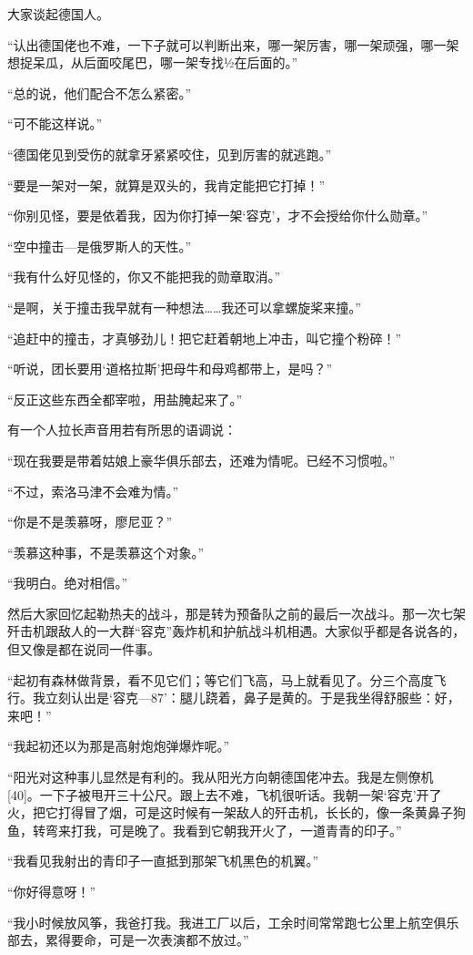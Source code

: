 大家谈起德国人。

“认出德国佬也不难，一下子就可以判断出来，哪一架厉害，哪一架顽强，哪一架想捉呆瓜，从后面咬尾巴，哪一架专找½在后面的。”

“总的说，他们配合不怎么紧密。”

“可不能这样说。”

“德国佬见到受伤的就拿牙紧紧咬住，见到厉害的就逃跑。”

“要是一架对一架，就算是双头的，我肯定能把它打掉！”

“你别见怪，要是依着我，因为你打掉一架‘容克’，才不会授给你什么勋章。”

“空中撞击—是俄罗斯人的天性。”

“我有什么好见怪的，你又不能把我的勋章取消。”

“是啊，关于撞击我早就有一种想法……我还可以拿螺旋桨来撞。”

“追赶中的撞击，才真够劲儿！把它赶着朝地上冲击，叫它撞个粉碎！”

“听说，团长要用‘道格拉斯’把母牛和母鸡都带上，是吗？”

“反正这些东西全都宰啦，用盐腌起来了。”

有一个人拉长声音用若有所思的语调说：

“现在我要是带着姑娘上豪华俱乐部去，还难为情呢。已经不习惯啦。”

“不过，索洛马津不会难为情。”

“你是不是羡慕呀，廖尼亚？”

“羡慕这种事，不是羡慕这个对象。”

“我明白。绝对相信。”

然后大家回忆起勒热夫的战斗，那是转为预备队之前的最后一次战斗。那一次七架歼击机跟敌人的一大群“容克”轰炸机和护航战斗机相遇。大家似乎都是各说各的，但又像是都在说同一件事。

“起初有森林做背景，看不见它们；等它们飞高，马上就看见了。分三个高度飞行。我立刻认出是‘容克—87’：腿儿跷着，鼻子是黄的。于是我坐得舒服些：好，来吧！”

“我起初还以为那是高射炮炮弹爆炸呢。”

“阳光对这种事儿显然是有利的。我从阳光方向朝德国佬冲去。我是左侧僚机[40]。一下子被甩开三十公尺。跟上去不难，飞机很听话。我朝一架‘容克’开了火，把它打得冒了烟，可是这时候有一架敌人的歼击机，长长的，像一条黄鼻子狗鱼，转弯来打我，可是晚了。我看到它朝我开火了，一道青青的印子。”

“我看见我射出的青印子一直抵到那架飞机黑色的机翼。”

“你好得意呀！”

“我小时候放风筝，我爸打我。我进工厂以后，工余时间常常跑七公里上航空俱乐部去，累得要命，可是一次表演都不放过。”

